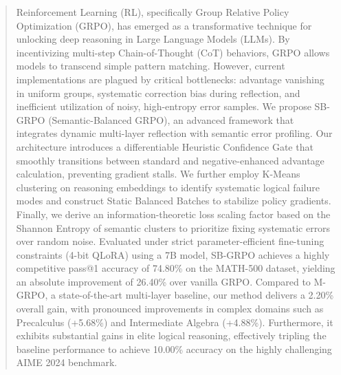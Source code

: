 \begin{abstract}
Reinforcement Learning (RL), specifically Group Relative Policy Optimization (GRPO), has emerged as a transformative technique for unlocking deep reasoning in Large Language Models (LLMs). By incentivizing multi-step Chain-of-Thought (CoT) behaviors, GRPO allows models to transcend simple pattern matching. However, current implementations are plagued by critical bottlenecks: advantage vanishing in uniform groups, systematic correction bias during reflection, and inefficient utilization of noisy, high-entropy error samples. We propose SB-GRPO (Semantic-Balanced GRPO), an advanced framework that integrates dynamic multi-layer reflection with semantic error profiling. Our architecture introduces a differentiable Heuristic Confidence Gate that smoothly transitions between standard and negative-enhanced advantage calculation, preventing gradient stalls. We further employ K-Means clustering on reasoning embeddings to identify systematic logical failure modes and construct Static Balanced Batches to stabilize policy gradients. Finally, we derive an information-theoretic loss scaling factor based on the Shannon Entropy of semantic clusters to prioritize fixing systematic errors over random noise. Evaluated under strict parameter-efficient fine-tuning constraints (4-bit QLoRA) using a 7B model, SB-GRPO achieves a highly competitive pass@1 accuracy of 74.80\% on the MATH-500 dataset, yielding an absolute improvement of 26.40\% over vanilla GRPO. Compared to M-GRPO, a state-of-the-art multi-layer baseline, our method delivers a 2.20\% overall gain, with pronounced improvements in complex domains such as Precalculus (+5.68\%) and Intermediate Algebra (+4.88\%). Furthermore, it exhibits substantial gains in elite logical reasoning, effectively tripling the baseline performance to achieve 10.00\% accuracy on the highly challenging AIME 2024 benchmark.

\end{abstract}